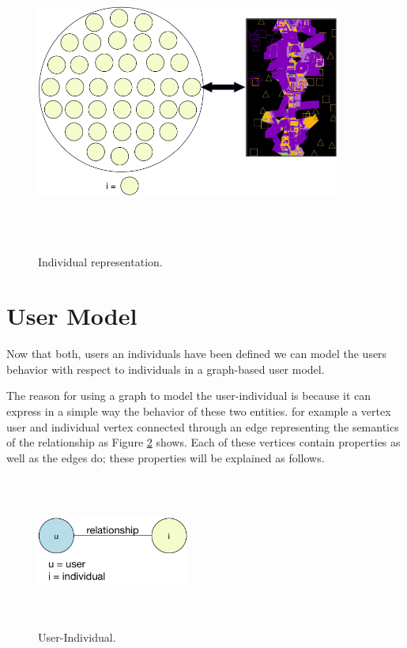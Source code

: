 \begin{figure}
\captionsetup{justification=centering,margin=2cm}
\centering
\setlength\fboxsep{0pt}
\setlength\fboxrule{0.7pt}
\includegraphics[width=10cm,height=10cm,keepaspectratio]{img/individual.png}
\caption{Individual representation.}
\label{fig:individual}
\end{figure}


\section{User Model}
Now that both, users an individuals have been defined we can
model the users behavior with respect to individuals in a graph-based user
model.

The reason for using a graph to model the user-individual is because it
can express in a simple way the behavior of these two entities.
for example a vertex user and individual vertex connected through an edge
representing the semantics of the relationship
as Figure \ref{fig:User-Individual} shows. Each of these vertices contain
properties as well as the edges do; these properties will be explained as follows.

\begin{figure}
\captionsetup{justification=centering,margin=2cm}
\centering
\setlength\fboxsep{0pt}
\setlength\fboxrule{0.7pt}
\includegraphics[width=5cm,height=5cm,keepaspectratio]{img/user_individual.png}
\caption{User-Individual.}
\label{fig:User-Individual}
\end{figure}

